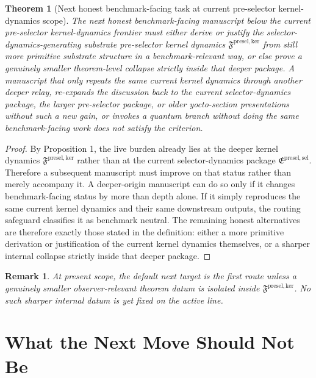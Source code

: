 \documentclass[11pt]{article}
\newcommand{\KernelPackage}{\mathfrak F^{\mathrm{presel,ker}}}
\newcommand{\PreSectionSelectorPackage}{\mathfrak E^{\mathrm{presel,sel}}}
\newtheorem{remark}{Remark}
\newtheorem{theorem}{Theorem}
\begin{document}
\begin{theorem}[Next honest benchmark-facing task at current pre-selector kernel-dynamics scope]
The next honest benchmark-facing manuscript below the current pre-selector kernel-dynamics frontier must either derive or justify the selector-dynamics-generating substrate pre-selector kernel dynamics \(\KernelPackage\) from still more primitive substrate structure in a benchmark-relevant way, or else prove a genuinely smaller theorem-level collapse strictly inside that deeper package. A manuscript that only repeats the same current kernel dynamics through another deeper relay, re-expands the discussion back to the current selector-dynamics package, the larger pre-selector package, or older yocto-section presentations without such a new gain, or invokes a quantum branch without doing the same benchmark-facing work does not satisfy the criterion.
\end{theorem}

\begin{proof}
By Proposition 1, the live burden already lies at the deeper kernel dynamics \(\KernelPackage\) rather than at the current selector-dynamics package \(\PreSectionSelectorPackage\). Therefore a subsequent manuscript must improve on that status rather than merely accompany it. A deeper-origin manuscript can do so only if it changes benchmark-facing status by more than depth alone. If it simply reproduces the same current kernel dynamics and their same downstream outputs, the routing safeguard classifies it as benchmark neutral. The remaining honest alternatives are therefore exactly those stated in the definition: either a more primitive derivation or justification of the current kernel dynamics themselves, or a sharper internal collapse strictly inside that deeper package.
\end{proof}

\begin{remark}
At present scope, the default next target is the first route unless a genuinely smaller observer-relevant theorem datum is isolated inside \(\KernelPackage\). No such sharper internal datum is yet fixed on the active line.
\end{remark}

\section{What the Next Move Should Not Be}
\end{document}
